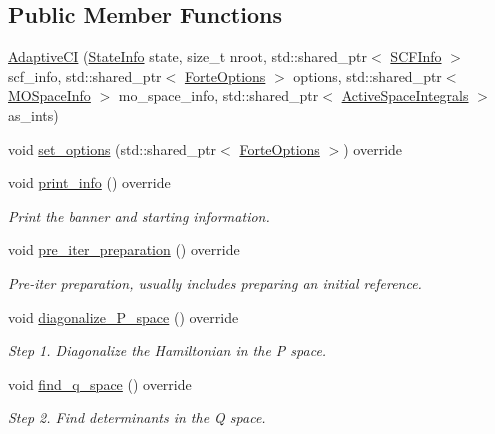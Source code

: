 \subsection*{Public Member Functions}
\begin{DoxyCompactItemize}
\item 
\mbox{\hyperlink{classforte_1_1_adaptive_c_i_ab283830208d19b0a7684a985cc81c629}{Adaptive\+CI}} (\mbox{\hyperlink{classforte_1_1_state_info}{State\+Info}} state, size\+\_\+t nroot, std\+::shared\+\_\+ptr$<$ \mbox{\hyperlink{classforte_1_1_s_c_f_info}{S\+C\+F\+Info}} $>$ scf\+\_\+info, std\+::shared\+\_\+ptr$<$ \mbox{\hyperlink{classforte_1_1_forte_options}{Forte\+Options}} $>$ options, std\+::shared\+\_\+ptr$<$ \mbox{\hyperlink{classforte_1_1_m_o_space_info}{M\+O\+Space\+Info}} $>$ mo\+\_\+space\+\_\+info, std\+::shared\+\_\+ptr$<$ \mbox{\hyperlink{classforte_1_1_active_space_integrals}{Active\+Space\+Integrals}} $>$ as\+\_\+ints)
\item 
void \mbox{\hyperlink{classforte_1_1_adaptive_c_i_a5f23c673c9c66b9b07de115a5992ae3f}{set\+\_\+options}} (std\+::shared\+\_\+ptr$<$ \mbox{\hyperlink{classforte_1_1_forte_options}{Forte\+Options}} $>$) override
\item 
void \mbox{\hyperlink{classforte_1_1_adaptive_c_i_a849ad578ee7ab5e78532a77df9b3ce9b}{print\+\_\+info}} () override
\begin{DoxyCompactList}\small\item\em Print the banner and starting information. \end{DoxyCompactList}\item 
void \mbox{\hyperlink{classforte_1_1_adaptive_c_i_afe7882564768985b90d3b3fd21c20a5f}{pre\+\_\+iter\+\_\+preparation}} () override
\begin{DoxyCompactList}\small\item\em Pre-\/iter preparation, usually includes preparing an initial reference. \end{DoxyCompactList}\item 
void \mbox{\hyperlink{classforte_1_1_adaptive_c_i_a3673ea1f26ce6b24e35def54b14fe62f}{diagonalize\+\_\+\+P\+\_\+space}} () override
\begin{DoxyCompactList}\small\item\em Step 1. Diagonalize the Hamiltonian in the P space. \end{DoxyCompactList}\item 
void \mbox{\hyperlink{classforte_1_1_adaptive_c_i_a84c2bbf2fd0dbcfe3732c0fb6a383bd8}{find\+\_\+q\+\_\+space}} () override
\begin{DoxyCompactList}\small\item\em Step 2. Find determinants in the Q space. \end{DoxyCompactList}\item 

\end{DoxyCompactItemize}
